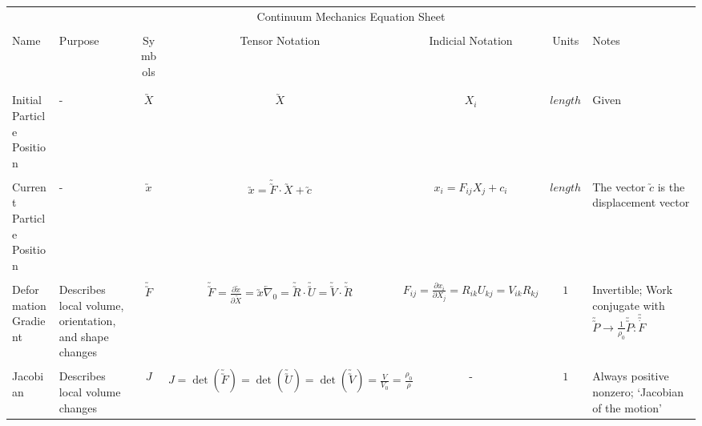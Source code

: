 \documentclass[10pt]{article}
\newcommand{\tu}[1]{\utilde{#1}}
\newcommand{\tuu}[1]{\utilde{\utilde{#1}}}
\begin{document}
\fontsize{13pt}{13pt}\selectfont
\begin{center}
\begin{tabular}{l m{3in} c c c c m{5in}}
\multicolumn{7}{c}{\fontsize{72pt}{72pt}\selectfont Continuum Mechanics Equation Sheet} \\

\\[72pt]  %
Name & Purpose & Symbols & Tensor Notation & Indicial Notation & Units & Notes \\
\\[-1ex]
\hline
\\[-1ex]
Initial Particle Position
&%
-
&%
$ \tu{X} $
&%
$ \tu{X} $
&%
$ X_{i} $
&%
$ length $
&%
Given
\\[1ex]

\hline
\\[-1ex]
Current Particle Position
&%
-
&%
$ \tu{x} $
&%
$ \tu{x} = \tuu{F} \cdot \tu{X} + \tu{c}$
&%
$ x_{i} = F_{ij} X_{j} + c_{i}$
&%
$ length $
&%
The vector $\tu{c}$ is the displacement vector
\\[1ex]

\hline
\\[-1ex]
Deformation Gradient
&%
Describes local volume, orientation, and shape changes
&%
$ \tuu{F} $
&%
$ \tuu{F}=\frac{\partial \tu{x}}{\partial \tu{X}} = \tu{x}\overleftarrow{\nabla}_{0} = \tuu{R} \cdot \tuu{U} = \tuu{V} \cdot \tuu{R}$
&%
$ F_{ij} =\frac{\partial x_{i}}{\partial X_{j}} = R_{ik} U_{kj} = V_{ik} R_{kj}$
&%
$ 1 $
&%
Invertible; Work conjugate with $\tuu{P} \rightarrow \frac{1}{\rho_0}\tuu{P}\colon\tuu{\dot{F}}$
\\[1ex]

\hline
\\[-1ex]
Jacobian
&%
Describes local volume changes
&%
$ J $
&%
$ J = \det(\tuu{F}) = \det(\tuu{U}) = \det(\tuu{V}) = \frac{V}{V_{0}} = \frac{\rho_{0}}{\rho}$
&%
-
&%
$ 1 $
&%
Always positive nonzero; `Jacobian of the motion'
\\[1ex]





\end{tabular}
\end{center}
\end{document}
